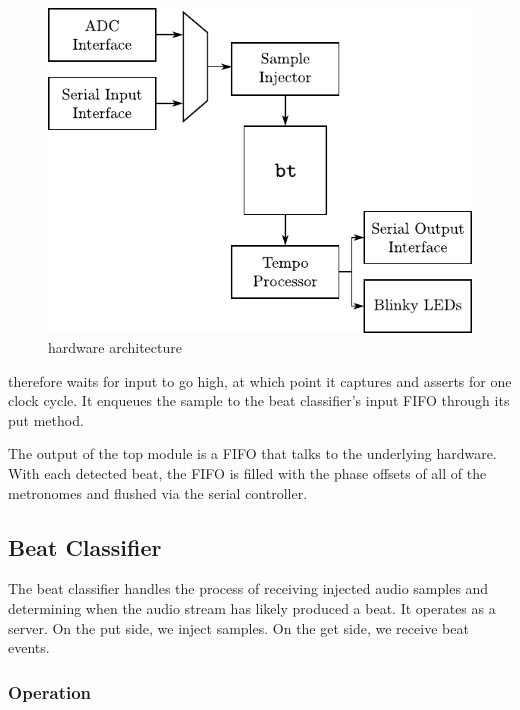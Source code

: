 \documentclass[letterpaper]{article}
\begin{document}
        \begin{figure}
            \centering
            \includegraphics{fig/hwarch.pdf}
            \caption{hardware architecture}
            \label{fig:hwarch}
        \end{figure}

        \projname{} therefore waits for input  to go high, at
        which point it captures  and asserts  for
        one clock cycle.  It enqueues the sample to the beat classifier's input
        FIFO through its put method.

        The output of the top module is a FIFO that talks to the underlying
        hardware.  With each detected beat, the FIFO is filled with the phase
        offsets of all of the metronomes and flushed via the serial controller.


    \subsection{Beat Classifier}

        The beat classifier handles the process of receiving injected audio samples
        and determining when the audio stream has likely produced a beat.  It
        operates as a server.  On the put side, we inject samples.  On the get
        side, we receive beat events.


        \subsubsection{Operation}
            
\end{document}
